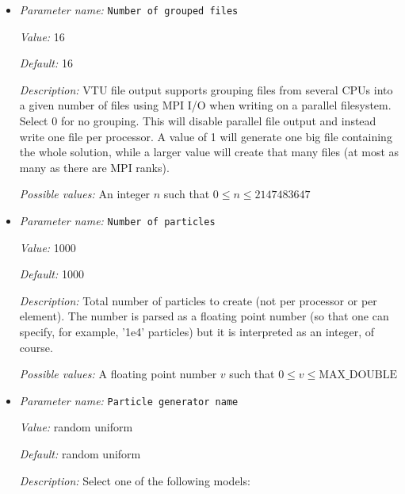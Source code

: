 \begin{itemize}
{\it Possible values:} An integer $n$ such that $0\leq n \leq 2147483647$
\item {\it Parameter name:} {\tt Number of grouped files}
\label{parameters:Postprocess/Particles/Number of grouped files}
\label{parameters:Postprocess/Particles/Number_20of_20grouped_20files}


{\it Value:} 16


{\it Default:} 16


{\it Description:} VTU file output supports grouping files from several CPUs into a given number of files using MPI I/O when writing on a parallel filesystem. Select 0 for no grouping. This will disable parallel file output and instead write one file per processor. A value of 1 will generate one big file containing the whole solution, while a larger value will create that many files (at most as many as there are MPI ranks).


{\it Possible values:} An integer $n$ such that $0\leq n \leq 2147483647$
\item {\it Parameter name:} {\tt Number of particles}
\label{parameters:Postprocess/Particles/Number of particles}
\label{parameters:Postprocess/Particles/Number_20of_20particles}


{\it Value:} 1000


{\it Default:} 1000


{\it Description:} Total number of particles to create (not per processor or per element). The number is parsed as a floating point number (so that one can specify, for example, '1e4' particles) but it is interpreted as an integer, of course.


{\it Possible values:} A floating point number $v$ such that $0 \leq v \leq \text{MAX\_DOUBLE}$
\item {\it Parameter name:} {\tt Particle generator name}
\label{parameters:Postprocess/Particles/Particle generator name}
\label{parameters:Postprocess/Particles/Particle_20generator_20name}


{\it Value:} random uniform


{\it Default:} random uniform


{\it Description:} Select one of the following models:


\end{itemize}
